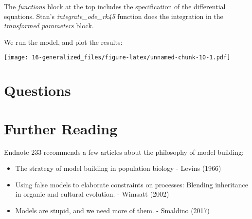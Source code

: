 \documentclass[
]{book}
\providecommand{\tightlist}{%
  \setlength{\itemsep}{0pt}\setlength{\parskip}{0pt}}
\begin{document}
The \emph{functions} block at the top includes the specification of the differential equations. Stan's \emph{integrate\_ode\_rk45} function does the integration in the \emph{transformed parameters} block.

We run the model, and plot the results:

\texttt{[image: 16-generalized\_files/figure-latex/unnamed-chunk-10-1.pdf]}

\hypertarget{questions-15}{%
\section{Questions}\label{questions-15}}

\hypertarget{further-reading-9}{%
\section*{Further Reading}\label{further-reading-9}}

Endnote 233 recommends a few articles about the philosophy of model building:

\begin{itemize}
\tightlist
\item
  The strategy of model building in population biology - Levins (1966)
\item
  Using false models to elaborate constraints on processes: Blending inheritance in organic and cultural evolution. - Wimsatt (2002)
\item
  Models are stupid, and we need more of them. - Smaldino (2017)
\end{itemize}

  
\end{document}
